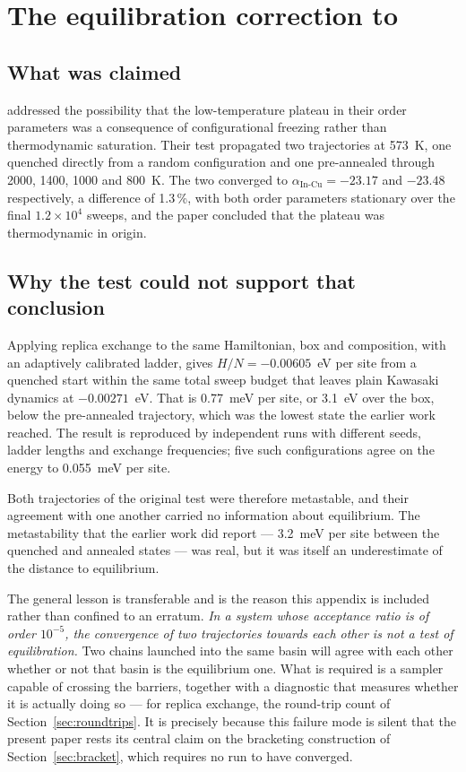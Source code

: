\documentclass[11pt,a4paper]{article}
\newcommand{\aInCu}{\alpha_{\mathrm{In\text{-}Cu}}}
\begin{document}
\appendix
\section{The equilibration correction to \citet{yu2026}}
\label{app:phase1}

\subsection{What was claimed}

\citet{yu2026} addressed the possibility that the low-temperature plateau in
their order parameters was a consequence of configurational freezing rather than
thermodynamic saturation. Their test propagated two trajectories at 573~K, one
quenched directly from a random configuration and one pre-annealed through 2000,
1400, 1000 and 800~K. The two converged to $\aInCu = -23.17$ and $-23.48$
respectively, a difference of 1.3\,\%, with both order parameters stationary over
the final $1.2\times10^4$ sweeps, and the paper concluded that the plateau was
thermodynamic in origin.

\subsection{Why the test could not support that conclusion}

Applying replica exchange to the same Hamiltonian, box and composition, with an
adaptively calibrated ladder, gives $H/N = -0.00605$~eV per site from a quenched
start within the same total sweep budget that leaves plain Kawasaki dynamics at
$-0.00271$~eV. That is 0.77~meV per site, or 3.1~eV over the box, below the
pre-annealed trajectory, which was the lowest state the earlier work reached.
The result is reproduced by independent runs with different seeds, ladder
lengths and exchange frequencies; five such configurations agree on the energy
to 0.055~meV per site.

Both trajectories of the original test were therefore metastable, and their
agreement with one another carried no information about equilibrium. The
metastability that the earlier work did report --- 3.2~meV per site between the
quenched and annealed states --- was real, but it was itself an underestimate of
the distance to equilibrium.

The general lesson is transferable and is the reason this appendix is included
rather than confined to an erratum. \emph{In a system whose acceptance ratio is
of order $10^{-5}$, the convergence of two trajectories towards each other is
not a test of equilibration.} Two chains launched into the same basin will
agree with each other whether or not that basin is the equilibrium one. What is
required is a sampler capable of crossing the barriers, together with a
diagnostic that measures whether it is actually doing so --- for replica
exchange, the round-trip count of Section~\ref{sec:roundtrips}. It is precisely
because this failure mode is silent that the present paper rests its central
claim on the bracketing construction of Section~\ref{sec:bracket}, which
requires no run to have converged.
\end{document}
